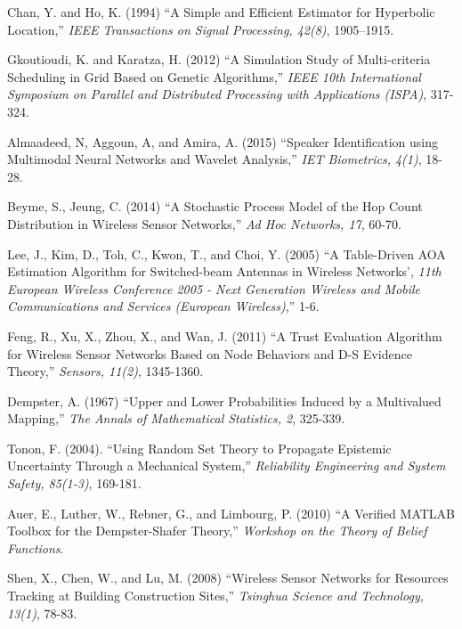 \documentclass[12pt]{uthesis-v12}  %
\begin{document}
\begin{thebibliography}{00}
Chan, Y. and Ho, K. (1994) ``A Simple and Efficient Estimator for Hyperbolic  Location,'' {\it IEEE Transactions on Signal Processing, 42(8)}, 1905--1915.

Gkoutioudi, K. and Karatza, H. (2012) ``A Simulation Study of Multi-criteria Scheduling in Grid Based on Genetic Algorithms,'' {\it IEEE 10th International Symposium on Parallel and Distributed Processing with Applications (ISPA)}, 317-324.


Almaadeed, N, Aggoun, A, and Amira, A. (2015) ``Speaker Identification using Multimodal Neural Networks and Wavelet Analysis,'' {\it IET Biometrics, 4(1)}, 18-28.

Beyme, S., Jeung, C. (2014) ``A Stochastic Process Model of the Hop Count Distribution in Wireless Sensor Networks,'' {\it Ad Hoc Networks, 17}, 60-70.


 Lee, J., Kim, D., Toh, C., Kwon, T., and Choi, Y. (2005) ``A Table-Driven AOA Estimation Algorithm for Switched-beam Antennas in Wireless Networks', {\it 11th European Wireless Conference 2005 - Next Generation Wireless and Mobile Communications and Services (European Wireless)},'' 1-6.

Feng, R., Xu, X., Zhou, X., and Wan, J. (2011) ``A Trust Evaluation Algorithm for Wireless Sensor Networks Based on Node Behaviors and D-S Evidence Theory,'' {\it Sensors, 11(2)}, 1345-1360.


Dempster, A. (1967) ``Upper and Lower Probabilities Induced by a Multivalued Mapping,'' {\it The Annals of Mathematical Statistics, 2}, 325-339.

Tonon, F. (2004). ``Using Random Set Theory to Propagate Epistemic Uncertainty Through a Mechanical System,'' {\it Reliability Engineering and System Safety,  85(1-3)}, 169-181.

Auer, E., Luther, W., Rebner, G., and Limbourg, P. (2010) ``A Verified MATLAB Toolbox for the Dempster-Shafer Theory,'' {\it Workshop on the Theory of Belief Functions}.

Shen, X., Chen, W., and Lu, M. (2008) ``Wireless Sensor Networks for Resources Tracking at Building Construction Sites,'' {\it Tsinghua Science and Technology, 13(1)}, 78-83.

\end{thebibliography}
\end{document}
